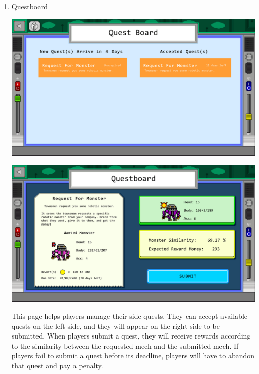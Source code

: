 \documentclass[12pt,oneside,openright,a4paper]{cpe-english-project}
\begin{document}
\begin{enumerate}
	\item Questboard \\
	\begin{minipage}[c]{\textwidth}\centering
	\includegraphics[width=14cm]{figure/screenshot/screenshot-quest-overview.png}
	\end{minipage}
	\begin{minipage}[c]{\textwidth}\centering
	\includegraphics[width=14cm]{figure/screenshot/screenshot-quest-detail.png}
	\end{minipage}
	This page helps players manage their side quests. They can accept available quests on the left side, and they will appear on the right side to be submitted. When players submit a quest, they will receive rewards according to the similarity between the requested mech and the submitted mech. If players fail to submit a quest before its deadline, players will have to abandon that quest and pay a penalty.


\end{enumerate}
\end{document}
